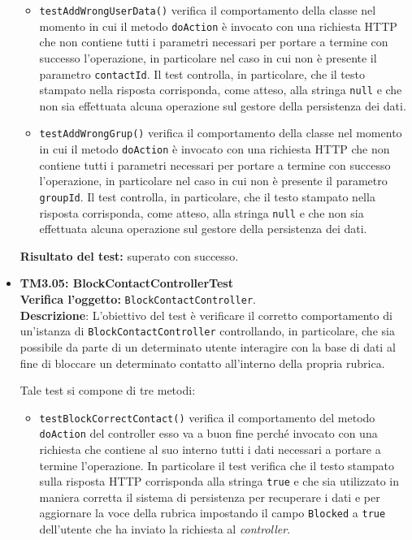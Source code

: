 \begin{itemize}
\begin{itemize}
\item \texttt{testAddWrongUserData()} verifica il comportamento della classe nel momento in cui il metodo \texttt{doAction} è invocato con una richiesta HTTP che non contiene tutti i parametri necessari per portare a termine con successo l'operazione, in particolare nel caso in cui non è presente il parametro \texttt{contactId}. Il test controlla, in particolare, che il testo stampato nella risposta corrisponda, come atteso, alla stringa \texttt{null} e che non sia effettuata alcuna operazione sul gestore della persistenza dei dati.

\item \texttt{testAddWrongGrup()} verifica il comportamento della classe nel momento in cui il metodo \texttt{doAction} è invocato con una richiesta HTTP che non contiene tutti i parametri necessari per portare a termine con successo l'operazione, in particolare nel caso in cui non è presente il parametro \texttt{groupId}. Il test controlla, in particolare, che il testo stampato nella risposta corrisponda, come atteso, alla stringa \texttt{null} e che non sia effettuata alcuna operazione sul gestore della persistenza dei dati.

\end{itemize}
\textbf{Risultato del test:} superato con successo.


\item \textbf{TM3.05: BlockContactControllerTest}\\
\textbf{Verifica l'oggetto:} \texttt{BlockContactController}.\\
\textbf{Descrizione}: L'obiettivo del test è verificare il corretto comportamento di un'istanza di \texttt{BlockContactController} controllando, in particolare, che sia possibile da parte di un determinato utente interagire con la base di dati al fine di bloccare un determinato contatto all'interno della propria rubrica.

Tale test si compone di tre metodi: 

\begin{itemize}
\item \texttt{testBlockCorrectContact()} verifica il comportamento del metodo \texttt{doAction} del controller esso va a buon fine perché invocato con una richiesta che contiene al suo interno tutti i dati necessari a portare a termine l'operazione. In particolare il test verifica che il testo stampato sulla risposta HTTP corrisponda alla stringa \texttt{true} e che sia utilizzato in maniera corretta il sistema di persistenza per recuperare i dati e per aggiornare la voce della rubrica impostando il campo \texttt{Blocked} a \texttt{true} dell'utente che ha inviato la richiesta al \textit{controller}.


\end{itemize}
\end{itemize}

